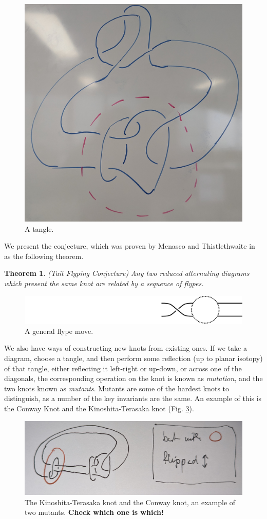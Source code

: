 \documentclass[12pt]{report}
\newcommand{\notered}[1]{{\color{Red} \textbf{#1}}}
\newtheorem*{theorem}{Theorem}
\begin{document}
\begin{figure}[ht]
	\centering
	\includegraphics[width=0.4\linewidth]{graphics/tangle}
	\caption{A tangle.}
	\label{fig:tangle}
\end{figure}

We present the conjecture, which was proven by Menasco and Thistlethwaite in \cite{classification-alternating-links} as the following theorem.
\begin{theorem}(Tait Flyping Conjecture)
	Any two reduced alternating diagrams which present the same knot are related by a sequence of flypes.
\end{theorem}

\begin{figure}[hbt]
	\centering
	\includegraphics[width=0.7\linewidth]{graphics/flype}
	\caption{A general flype move.}
	\label{fig:flype}
\end{figure}

We also have ways of constructing new knots from existing ones. If we take a diagram, choose a tangle, and then perform some reflection (up to planar isotopy) of that tangle, either reflecting it left-right or up-down, or across one of the diagonals, the corresponding operation on the knot is known as \textit{mutation}, and the two knots known as \textit{mutants}. Mutants are some of the hardest knots to distinguish, as a number of the key invariants are the same. An example of this is the Conway Knot and the Kinoshita-Terasaka knot (Fig. \ref{fig:kinoshita-terasaka-mutants}).

\begin{figure}[h]
	\centering
	\includegraphics[width=0.95\linewidth]{graphics/Kinoshita_Terasaka_mutants}
	\caption{The Kinoshita-Terasaka knot and the Conway knot, an example of two mutants. \notered{Check which one is which!}}
	\label{fig:kinoshita-terasaka-mutants}
\end{figure}
\end{document}
